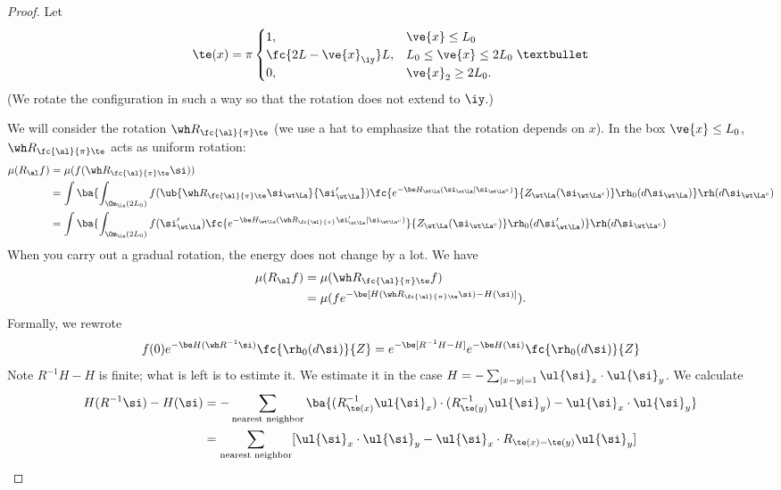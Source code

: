 \begin{proof}
Let 
\[
\te(x) = \pi \begin{cases}
1, &\ve{x}\le L_0\\
\fc{2L-\ve{x}_{\iy}}L, & L_0\le \ve{x}\le 2L_0\\
0, &\ve{x}_2\ge 2L_0.
\end{cases}•
\]
(We rotate the configuration in such a way so that the rotation does not extend to $\iy$.)

We will consider the rotation $\wh R_{\fc{\al}{\pi}\te}$ (we use a hat to emphasize that the rotation depends on $x$). 
In the box $\ve{x}\le L_0$, $\wh R_{\fc{\al}{\pi}\te}$ acts as uniform rotation:
\begin{align}
\mu(R_\al f) &= \mu(f(\wh R_{\fc{\al}{\pi}\te}\si))\\
&=\int \ba{
\int_{\Om_{\La}(2L_0)} 
f(\ub{\wh R_{\fc{\al}{\pi}\te} \si_{\wt \La}}{\si_{\wt \La}'}) \fc{e^{-\be H_{\wt \La}(\si_{\wt \La}|\si_{\wt \La^c})}}{Z_{\wt\La}(\si_{\wt \La^c})} \rh_0(d\si_{\wt \La})
} \rh(d\si_{\wt\La^c})\\
&=\int \ba{
\int_{\Om_{\La}(2L_0)} 
f(\si_{\wt \La}') \fc{e^{-\be H_{\wt \La}(\wh R_{\fc{\al}{\pi}}\si_{\wt \La}'|\si_{\wt \La^c})}}{Z_{\wt\La}(\si_{\wt \La^c})} \rh_0(d\si_{\wt \La}')
} \rh(d\si_{\wt\La^c})
\end{align}
When you carry out a gradual rotation, the energy does not change by a lot.
We have
\begin{align}
\mu(R_\al f) &= \mu(\wh R_{\fc{\al}{\pi}\te}f) \\
&= \mu(fe^{-\be [H(\wh R_{\fc{\al}{\pi}\te}\si) - H(\si)]}).
\end{align}
Formally, we rewrote
\[
f(0) e^{-\be H(\wh R^{-1}\si)} \fc{\rh_0(d\si)}{Z}
= e^{-\be[R^{-1}H - H]} e^{-\be H(\si)}\fc{\rh_0(d\si)}{Z}
\]
Note $R^{-1}H-H$ is finite; what is left is to estimte it. We estimate it in the case $H=-\sum_{|x-y|=1}\ul{\si}_x\cdot \ul{\si}_y$. We calculate
\begin{align}
H(R^{-1}\si) - H(\si) 
&= - \sum_{\text{nearest neighbor}} \ba{
(R_{\te(x)}^{-1}\ul{\si}_x)\cdot 
(R_{\te(y)}^{-1}\ul{\si}_y) - \ul{\si}_x\cdot \ul{\si}_y
}\\
&= \sum_{\text{nearest neighbor}} [\ul{\si}_x \cdot \ul{\si}_y - \ul{\si}_x \cdot R_{\te(x) - \te(y)} \ul{\si}_y]\\

\end{align}
\end{proof}
